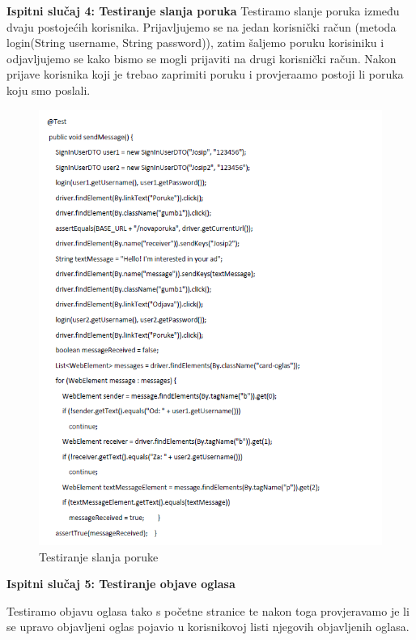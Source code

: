 			
			
			
			\textbf{Ispitni slučaj 4: Testiranje slanja poruka
				}
			Testiramo slanje poruka između dvaju postojećih korisnika. Prijavljujemo se na jedan korisnički račun (metoda login(String username, String password)), zatim šaljemo poruku korisiniku i odjavljujemo se kako bismo se mogli prijaviti na drugi korisnički račun. Nakon prijave korisnika koji je trebao zaprimiti poruku i provjeraamo postoji li poruka koju smo poslali.
			
			
			\begin{figure}[H]
				\includegraphics[scale=0.9]{slike/sel4.PNG} %
				\centering
				\caption{Testiranje slanja poruke}
				\label{fig:sel4}
			\end{figure}
			
			\textbf{Ispitni slučaj 5: Testiranje objave oglasa
				}
			
			Testiramo objavu oglasa tako s početne stranice te nakon toga provjeravamo je li se upravo objavljeni oglas pojavio u korisnikovoj listi njegovih objavljenih oglasa. 
			
